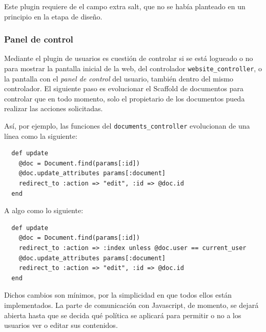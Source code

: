 Este plugin requiere de el campo extra salt, que no se había planteado en un principio en la etapa de diseño.


\subsubsection{Panel de control} %
\label{ssub:panel_de_control}

Mediante el plugin de usuarios es cuestión de controlar si se está logueado o no para mostrar la pantalla inicial de la web, del controlador \texttt{website\_controller}, o la pantalla con el \emph{panel de control} del usuario, también dentro del mismo controlador. El siguiente paso es evolucionar el Scaffold de documentos para controlar que en todo momento, solo el propietario de los documentos pueda realizar las acciones solicitadas.

Así, por ejemplo, las funciones del \texttt{documents\_controller} evolucionan de una línea como la siguiente:

\begin{verbatim}
  def update
    @doc = Document.find(params[:id])
    @doc.update_attributes params[:document]
    redirect_to :action => "edit", :id => @doc.id
  end
\end{verbatim}

A algo como lo siguiente:

\begin{verbatim}
  def update
    @doc = Document.find(params[:id])
    redirect_to :action => :index unless @doc.user == current_user
    @doc.update_attributes params[:document]
    redirect_to :action => "edit", :id => @doc.id
  end
\end{verbatim}

Dichos cambios son mínimos, por la simplicidad en que todos ellos están implementados. La parte de comunicación con Javascript, de momento, se dejará abierta hasta que se decida qué política se aplicará para permitir o no a los usuarios ver o editar sus contenidos.



